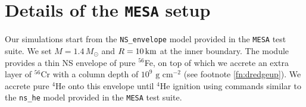 \documentclass[apj,usenatbib, iop, twocolappendix]{emulateapj}
\newcommand{\trm}[1]{\textrm{#1}}
\begin{document}





\appendix

\section{Details of the \texttt{MESA} setup}\label{app:mesa}

Our simulations start from the \texttt{NS\_envelope} model provided in the \texttt{MESA} test suite.  We set  $M=1.4\,M_\odot$ and $R=10\,{\rm km}$ at the inner boundary.  The module provides a thin NS envelope of pure $^{56}$Fe, on top of which we accrete an extra layer of $^{56}$Cr with a column depth of $10^9\trm{ g cm}^{-2}$ (see footnote \ref{fn:dredgeup}). We accrete pure $^4$He onto this envelope until $^4$He ignition using commands similar to the \texttt{ns\_he} model provided in the \texttt{MESA} test suite. 
\end{document}
